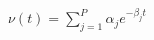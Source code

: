 \documentclass{article}
\begin{document}
$\nu ( t) = \sum_{j = 1}^P \alpha_j e^{- \beta_j t}$
\end{document}
